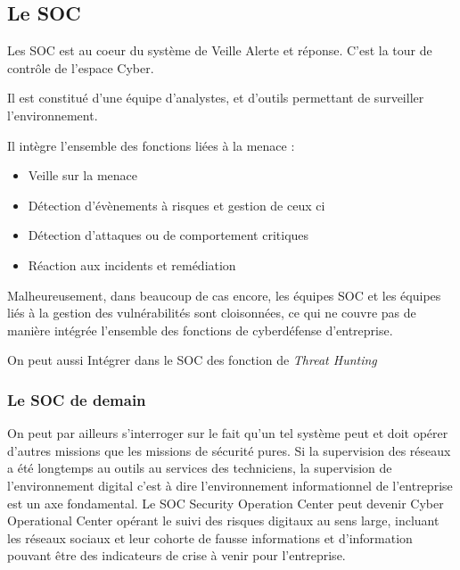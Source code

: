 
\subsection{Le SOC}

Les SOC est au coeur du système de Veille Alerte et réponse. C'est la tour de contrôle de l'espace Cyber.

Il est constitué d'une équipe d'analystes, et d'outils permettant de surveiller l'environnement.


Il intègre l'ensemble des fonctions liées à la menace :

\begin{itemize}
  \item Veille sur la menace
  \item Détection d'évènements à risques et gestion de ceux ci
  \item Détection d'attaques ou de comportement critiques
  \item Réaction aux incidents et remédiation

\end{itemize}

Malheureusement, dans beaucoup de cas encore, les équipes SOC et les équipes liés à la gestion des vulnérabilités sont cloisonnées, ce qui ne couvre pas de manière intégrée l'ensemble des fonctions de cyberdéfense d'entreprise.

On peut aussi Intégrer dans  le SOC des fonction de  \textit{Threat Hunting }

\subsubsection{Le SOC de demain}
On peut par ailleurs s'interroger sur le fait qu'un tel système peut et doit opérer d'autres missions que les missions de sécurité pures. Si la supervision des réseaux a été longtemps au outils au services des techniciens, la supervision de l'environnement digital c'est à dire l'environnement informationnel de l'entreprise est un axe fondamental. Le SOC Security Operation Center peut devenir Cyber Operational Center opérant le suivi des risques digitaux au sens large, incluant les réseaux sociaux et leur cohorte de fausse informations et d'information pouvant être des indicateurs de crise à venir pour l'entreprise.

